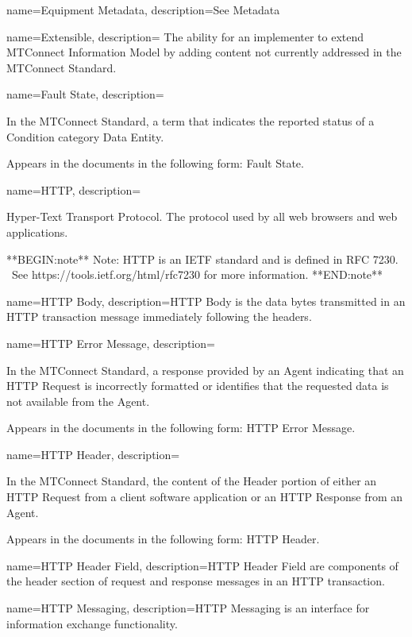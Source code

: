 {
    name={Equipment Metadata},
	description={See \gls{Metadata}}
}

{
    name={Extensible},
	description={
	The ability for an implementer to extend \gls{MTConnect Information Model} by adding content not currently addressed in the MTConnect Standard.
}
}

{
    name={Fault State},
	description={
	In the MTConnect Standard, a term that indicates the reported status of a \gls{Condition} category \gls{Data Entity}.   

	Appears in the documents in the following form: \gls{Fault State}.
}
}

{
    name={HTTP},
	description={
	Hyper-Text Transport Protocol.  The protocol used by all web browsers and web applications.

    **BEGIN:note**
	Note:  HTTP is an IETF standard and is defined in RFC 7230. \ See https://tools.ietf.org/html/rfc7230 for more information.
	**END:note**
}
}

{
    name={HTTP Body},
	description={\gls{HTTP Body} is the data bytes transmitted in an HTTP transaction message immediately following the headers.}
}

{
    name={HTTP Error Message},
	description={
	In the MTConnect Standard, a response provided by an \gls{Agent} indicating that an \gls{HTTP Request} is incorrectly formatted or identifies that the requested data is not available from the \gls{Agent}.  

	Appears in the documents in the following form: \gls{HTTP Error Message}.
}
}

{
    name={HTTP Header},
	description={
	In the MTConnect Standard, the content of the \gls{Header} portion of either an \gls{HTTP Request} from a client software application or an \gls{HTTP Response} from an \gls{Agent}.

	Appears in the documents in the following form: \gls{HTTP Header}.
}
}

{
    name={HTTP Header Field},
	description={\gls{HTTP Header Field} are components of the header section of request and response messages in an HTTP transaction.}
}

{
    name={HTTP Messaging},
	description={\gls{HTTP Messaging} is an interface for information exchange functionality.}
}

